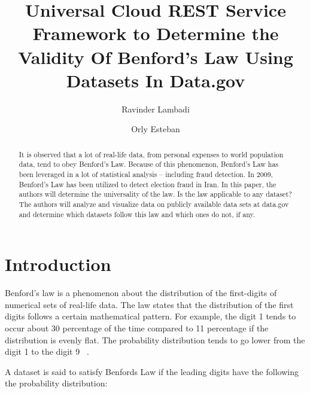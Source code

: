 
\title{Universal Cloud REST Service Framework to Determine 
the Validity Of Benford’s Law Using Datasets In Data.gov}

\author{Ravinder Lambadi}


\author{Orly Esteban}

\begin{abstract}
It is observed that a lot of real-life data, from personal 
expenses to world population data, tend to obey Benford’s Law. 
Because of this phenomenon, Benford’s Law has been leveraged 
in a lot of statistical analysis – including fraud detection. 
In 2009,  Benford’s Law has been utilized to detect election 
fraud in Iran. In this paper, the authors will determine the 
universality of the law. Is the law applicable to any dataset? 
The authors will analyze and visualize data on publicly available 
data sets at data.gov and determine which datasets follow this 
law and which ones do not, if any.
\end{abstract}


\maketitle

\section{Introduction}
Benford’s law is a phenomenon about the distribution of 
the first-digits of numerical sets of real-life data. 
The law states that the distribution of the first digits 
follows a certain mathematical pattern. For example, the 
digit 1 tends to occur about 30 percentage of the time compared 
to 11 percentage if the distribution is evenly flat. 
The probability distribution tends to go lower from the 
digit 1 to the digit 9 ~\cite{hid-sp18-514-benfordwiki}.

A dataset is said to satisfy Benfords Law if the leading 
digits have the following the probability distribution: 

